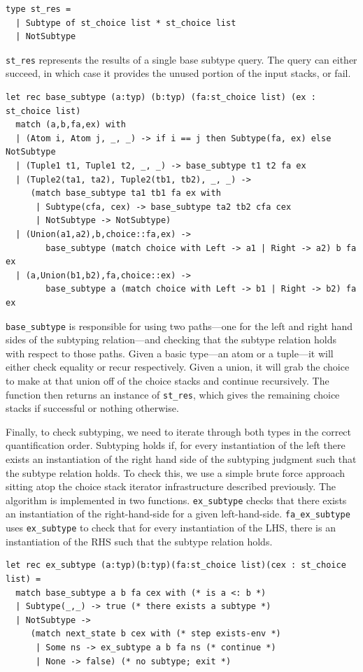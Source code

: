 \documentclass[a4paper,english]{lipics-v2018}
\begin{document}
\begin{verbatim}
type st_res =
  | Subtype of st_choice list * st_choice list
  | NotSubtype
\end{verbatim}

\verb|st_res| represents the results of a single base subtype query. The query
can either succeed, in which case it provides the unused portion of the input
stacks, or fail. 

\begin{verbatim}
let rec base_subtype (a:typ) (b:typ) (fa:st_choice list) (ex : st_choice list)
  match (a,b,fa,ex) with
  | (Atom i, Atom j, _, _) -> if i == j then Subtype(fa, ex) else NotSubtype
  | (Tuple1 t1, Tuple1 t2, _, _) -> base_subtype t1 t2 fa ex
  | (Tuple2(ta1, ta2), Tuple2(tb1, tb2), _, _) ->
     (match base_subtype ta1 tb1 fa ex with
      | Subtype(cfa, cex) -> base_subtype ta2 tb2 cfa cex
      | NotSubtype -> NotSubtype)
  | (Union(a1,a2),b,choice::fa,ex) -> 
  		base_subtype (match choice with Left -> a1 | Right -> a2) b fa ex
  | (a,Union(b1,b2),fa,choice::ex) -> 
  		base_subtype a (match choice with Left -> b1 | Right -> b2) fa ex
\end{verbatim}

\verb|base_subtype| is responsible for using two paths---one for the left and
right hand sides of the subtyping relation---and checking that the subtype
relation holds with respect to those paths. Given a basic type---an atom or a
tuple---it will either check equality or recur respectively. Given a union, it
will grab the choice to make at that union off of the choice stacks and continue
recursively. The function then returns an instance of \verb|st_res|, which
gives the remaining choice stacks if successful or nothing otherwise.


Finally, to check subtyping, we need to iterate through both types in the 
correct quantification order. Subtyping holds if, for every instantiation 
of the left there exists an instantiation of the right hand side of the
subtyping judgment such that the subtype relation holds. To check this,
we use a simple brute force approach sitting atop the choice stack iterator
infrastructure described previously. The algorithm is implemented in two
functions. \verb|ex_subtype| checks that there exists an instantiation
of the right-hand-side for a given left-hand-side. \verb|fa_ex_subtype|
uses \verb|ex_subtype| to check that for every instantiation of the LHS,
there is an instantiation of the RHS such that the subtype relation holds.

\begin{verbatim}
let rec ex_subtype (a:typ)(b:typ)(fa:st_choice list)(cex : st_choice list) =
  match base_subtype a b fa cex with (* is a <: b *)
  | Subtype(_,_) -> true (* there exists a subtype *)
  | NotSubtype -> 
     (match next_state b cex with (* step exists-env *)
      | Some ns -> ex_subtype a b fa ns (* continue *)
      | None -> false) (* no subtype; exit *)

\end{verbatim}
\end{document}
